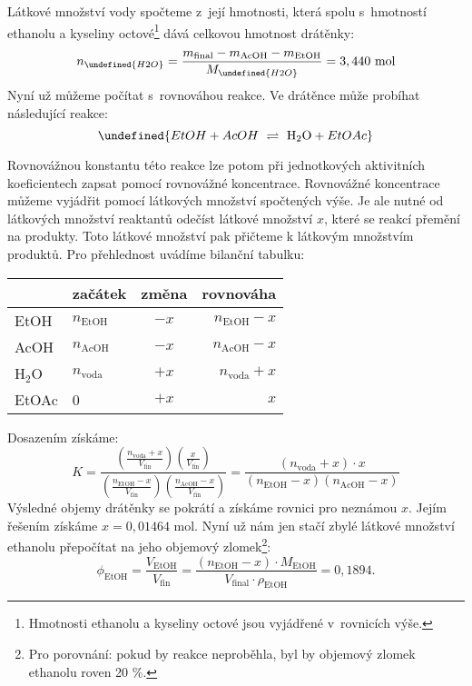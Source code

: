 \documentclass{book}
\let\ch\undefined
\begin{document}
Látkové množství vody spočteme z~její hmotnosti, která spolu s~hmotností
ethanolu a kyseliny octové\footnote{Hmotnosti ethanolu a kyseliny octové jsou vyjádřené v~rovnicích výše.} dává celkovou hmotnost drátěnky: 
\[
n_{\ch{H2O}}=\frac{m_{\mathrm{final}}-m_{\mathrm{AcOH}}-m_{\mathrm{EtOH}}}{M_{\ch{H2O}}}=3,440\mathrm{~mol}
\]
Nyní už můžeme počítat s~rovnováhou reakce. Ve drátěnce může probíhat
následující reakce: 
\[
\ch{EtOH + AcOH \ \rightleftharpoons\ \mathrm{H_{2}O} + EtOAc}
\]

Rovnovážnou konstantu této reakce lze potom při jednotkových aktivitních
koeficientech zapsat pomocí rovnovážné koncentrace. Rovnovážné koncentrace
můžeme vyjádřit pomocí látkových množství spočtených výše. Je ale
nutné od látkových množství reaktantů odečíst látkové množství $x$,
které se reakcí přemění na produkty. Toto látkové množství pak přičteme
k látkovým množstvím produktů. Pro přehlednost uvádíme bilanční tabulku:

\begin{center}
\begin{tabular}{l|l|c|r}
       & začátek & změna & rovnováha  \\\hline \hline
EtOH   & $n_{\mathrm{EtOH}}$  & $-x$  & $n_{\mathrm{EtOH}}-x$ \\\hline
AcOH   & $n_{\mathrm{AcOH}}$  & $-x$  & $n_{\mathrm{AcOH}}-x$ \\\hline
H$_2$O & $n_{\mathrm{voda}}$   & $+x$  & $n_{\mathrm{voda}}+x$  \\\hline
EtOAc  & 0       & $+x$  & $x$       
\end{tabular}
\end{center}

\newpage %
Dosazením získáme: 
\[
K=\frac{\left(\frac{n_{\mathrm{voda}}+x}{V_{\mathrm{fin}}}\right)\left(\frac{x}{V_{\mathrm{fin}}}\right)}{\left(\frac{n_{\mathrm{EtOH}}-x}{V_{\mathrm{fin}}}\right)\left(\frac{n_{\mathrm{AcOH}}-x}{V_{\mathrm{fin}}}\right)}=\frac{(n_{\text{voda}}+x)\cdot x}{(n_{\mathrm{EtOH}}-x)(n_{\mathrm{AcOH}}-x)}
\]
Výsledné objemy drátěnky se pokrátí a získáme rovnici pro neznámou
$x$. Jejím řešením získáme $x=0,01464$ mol. Nyní už nám jen stačí
zbylé látkové množství ethanolu přepočítat na jeho objemový zlomek\footnote{Pro porovnání: pokud by reakce neproběhla, byl by objemový zlomek ethanolu roven
20 \%.}: 
\[
\phi_{\mathrm{EtOH}}=\frac{V_{\mathrm{EtOH}}}{V_{\mathrm{fin}}}=\frac{(n_{\mathrm{EtOH}}-x)\cdot M_{\mathrm{EtOH}}}{V_{\mathrm{final}}\cdot\rho_{\mathrm{EtOH}}}=0,1894.
\]
\end{document}
